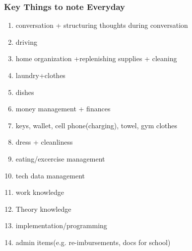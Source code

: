 \begin{frame} 
\frametitle{Key Things to note Everyday}
\begin{enumerate}
\item \tiny conversation + structuring thoughts during conversation
\item \tiny driving
\item \tiny home organization +replenishing supplies + cleaning 
\item \tiny laundry+clothes  
\item \tiny dishes 
\item \tiny money management + finances 
\item \tiny keys, wallet, cell phone(charging), towel, gym clothes 
\item \tiny dress + cleanliness 
\item \tiny eating/excercise management 
\item \tiny tech data management 
\item \tiny work knowledge
\item \tiny Theory knowledge
\item \tiny implementation/programming
\item \tiny admin items(e.g. re-imbursements, docs for school)
\end{enumerate}
\end{frame}
